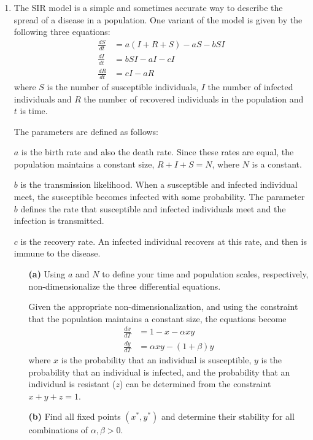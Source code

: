\documentclass[10pt,letterpaper]{report}
\begin{document}
\begin{enumerate}
\item
\begin{qbox}
The SIR model is a simple and sometimes accurate way to describe the spread of a
disease in a population. One variant of the model is given by the following three equations:
\begin{align*}
\frac{dS}{dt} &= a(I +R +S) - aS - bS I \\
\frac{d I}{dt} &= bS I - a I - c I \\
\frac{dR}{dt} &= c I - aR
\end{align*}
where $S$ is the number of susceptible individuals, $I$ the number of infected individuals and $R$ the number of recovered individuals in the population and $t$ is time.

The parameters are defined as follows:

$a$ is the birth rate and also the death rate. Since these rates are equal, the population maintains a constant size, $R + I +S = N$, where $N$ is a constant.

$b$ is the transmission likelihood. When a susceptible and infected individual meet, the susceptible becomes infected with some probability. The parameter $b$ defines the rate that susceptible and infected individuals meet and the infection is transmitted.

$c$ is the recovery rate. An infected individual recovers at this rate, and then is immune to the
disease.

\begin{itemize}
    \item[\textbf{(a)}] Using $a$ and $N$ to define your time and population scales, respectively, non-dimensionalize the three differential equations.
    
    Given the appropriate non-dimensionalization, and using the constraint that the population maintains a constant size, the equations become
    \begin{align*}
        \frac{dx}{dT} &= 1 - x - \alpha x y \\
        \frac{dy}{dT} &= \alpha x y - (1 + \beta) y
    \end{align*}
    where $x$ is the probability that an individual is susceptible, $y$ is the probability that an individual is infected, and the probability that an individual is resistant ($z$) can be determined from the constraint $x + y + z = 1$.
    
    \item[\textbf{(b)}] Find all fixed points $(x^*, y^*)$ and determine their stability for all combinations of $\alpha, \beta > 0$.
    

\end{itemize}
\end{qbox}
\end{enumerate}
\end{document}
